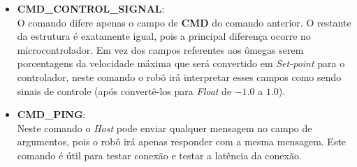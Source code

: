 \begin{itemize}
    \item \textbf{CMD\_CONTROL\_SIGNAL}:\\
        
        O comando difere apenas o campo de \textbf{CMD} do comando anterior. O restante da estrutura é exatamente igual, pois a principal diferença ocorre no microcontrolador. Em vez dos campos referentes aos ômegas serem porcentagens da velocidade máxima que será convertido em \textit{Set-point} para o controlador, neste comando o robô irá interpretar esses campos como sendo sinais de controle (após convertê-los para \emph{Float} de $-1.0$ a $1.0$).
        
    \item \textbf{CMD\_PING}:\\
        Neste comando o \textit{Host} pode enviar qualquer mensagem no campo de argumentos, pois o robô irá apenas responder com a mesma mensagem. Este comando é útil para testar conexão e testar a latência da conexão.
    
\end{itemize}